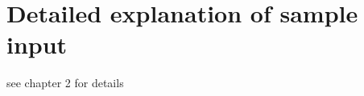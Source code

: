 \chapter{Detailed explanation of sample input}
\label{section_input_explanation}


see chapter 2 for details